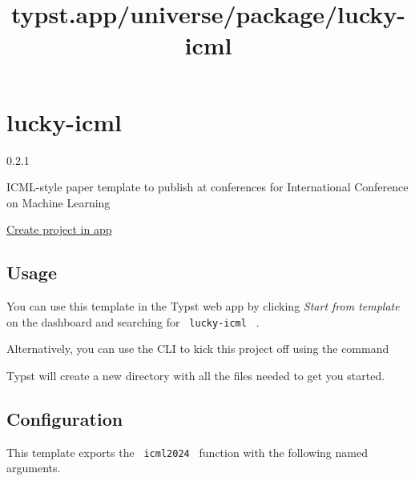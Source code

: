 \title{typst.app/universe/package/lucky-icml}

\label{banner}
\label{template-thumbnail}

\section{lucky-icml}\label{lucky-icml}

{ 0.2.1 }

ICML-style paper template to publish at conferences for International
Conference on Machine Learning

\href{/app?template=lucky-icml&version=0.2.1}{Create project in app}

\label{readme}
\subsection{Usage}\label{usage}

You can use this template in the Typst web app by clicking \emph{Start
from template} on the dashboard and searching for
\texttt{\ lucky-icml\ } .

Alternatively, you can use the CLI to kick this project off using the
command

\begin{Shaded}
\begin{Highlighting}[]
\end{Highlighting}
\end{Shaded}

Typst will create a new directory with all the files needed to get you
started.

\subsection{Configuration}\label{configuration}

This template exports the \texttt{\ icml2024\ } function with the
following named arguments.

